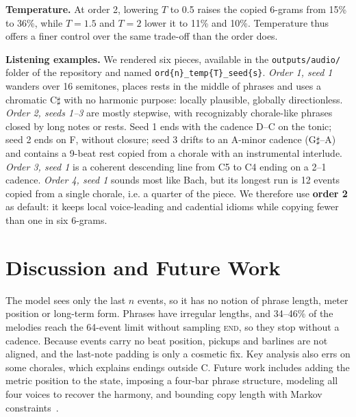 \documentclass{article}
\begin{document}
\textbf{Temperature.} At order 2, lowering $T$ to 0.5 raises the copied 6-grams from 15\% to 36\%, while $T=1.5$ and $T=2$ lower it to 11\% and 10\%. Temperature thus offers a finer control over the same trade-off than the order does.

\textbf{Listening examples.} We rendered six pieces, available in the \texttt{outputs/audio/} folder of the repository and named \texttt{ord\{n\}\_temp\{T\}\_seed\{s\}}. \emph{Order 1, seed 1} wanders over 16 semitones, places rests in the middle of phrases and uses a chromatic C$\sharp$ with no harmonic purpose: locally plausible, globally directionless. \emph{Order 2, seeds 1--3} are mostly stepwise, with recognizably chorale-like phrases closed by long notes or rests. Seed 1 ends with the cadence D--C on the tonic; seed 2 ends on F, without closure; seed 3 drifts to an A-minor cadence (G$\sharp$--A) and contains a 9-beat rest copied from a chorale with an instrumental interlude. \emph{Order 3, seed 1} is a coherent descending line from C5 to C4 ending on a 2--1 cadence. \emph{Order 4, seed 1} sounds most like Bach, but its longest run is 12 events copied from a single chorale, i.e. a quarter of the piece. We therefore use \textbf{order 2} as default: it keeps local voice-leading and cadential idioms while copying fewer than one in six 6-grams.

\section{Discussion and Future Work}\label{sec:discussion}

The model sees only the last $n$ events, so it has no notion of phrase length, meter position or long-term form. Phrases have irregular lengths, and 34--46\% of the melodies reach the 64-event limit without sampling \textsc{end}, so they stop without a cadence. Because events carry no beat position, pickups and barlines are not aligned, and the last-note padding is only a cosmetic fix. Key analysis also errs on some chorales, which explains endings outside C. Future work includes adding the metric position to the state, imposing a four-bar phrase structure, modeling all four voices to recover the harmony, and bounding copy length with Markov constraints~\cite{pachet2011,papadopoulos2014}.


\end{document}
